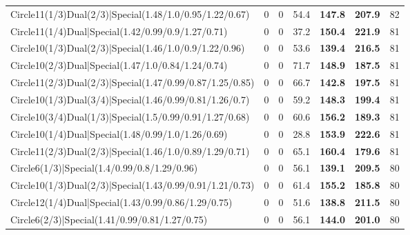 \begin{tabular}{lrrrllr}
 Circle11(1/3)Dual(2/3)|Special(1.48/1.0/0.95/1.22/0.67)        &          0   &            0   &          54.4 & \textbf{147.8} & \textbf{207.9} &           82 \\
 Circle11(1/4)Dual|Special(1.42/0.99/0.9/1.27/0.71)             &          0   &            0   &          37.2 & \textbf{150.4} & \textbf{221.9} &           81 \\
 Circle10(1/3)Dual(2/3)|Special(1.46/1.0/0.9/1.22/0.96)         &          0   &            0   &          53.6 & \textbf{139.4} & \textbf{216.5} &           81 \\
 Circle10(2/3)Dual|Special(1.47/1.0/0.84/1.24/0.74)             &          0   &            0   &          71.7 & \textbf{148.9} & \textbf{187.5} &           81 \\
 Circle11(2/3)Dual(2/3)|Special(1.47/0.99/0.87/1.25/0.85)       &          0   &            0   &          66.7 & \textbf{142.8} & \textbf{197.5} &           81 \\
 Circle10(1/3)Dual(3/4)|Special(1.46/0.99/0.81/1.26/0.7)        &          0   &            0   &          59.2 & \textbf{148.3} & \textbf{199.4} &           81 \\
 Circle10(3/4)Dual(1/3)|Special(1.5/0.99/0.91/1.27/0.68)        &          0   &            0   &          60.6 & \textbf{156.2} & \textbf{189.3} &           81 \\
 Circle10(1/4)Dual|Special(1.48/0.99/1.0/1.26/0.69)             &          0   &            0   &          28.8 & \textbf{153.9} & \textbf{222.6} &           81 \\
 Circle11(2/3)Dual(2/3)|Special(1.46/1.0/0.89/1.29/0.71)        &          0   &            0   &          65.1 & \textbf{160.4} & \textbf{179.6} &           81 \\
 Circle6(1/3)|Special(1.4/0.99/0.8/1.29/0.96)                   &          0   &            0   &          56.1 & \textbf{139.1} & \textbf{209.5} &           80 \\
 Circle10(1/3)Dual(2/3)|Special(1.43/0.99/0.91/1.21/0.73)       &          0   &            0   &          61.4 & \textbf{155.2} & \textbf{185.8} &           80 \\
 Circle12(1/4)Dual|Special(1.43/0.99/0.86/1.29/0.75)            &          0   &            0   &          51.6 & \textbf{138.8} & \textbf{211.5} &           80 \\
 Circle6(2/3)|Special(1.41/0.99/0.81/1.27/0.75)                 &          0   &            0   &          56.1 & \textbf{144.0} & \textbf{201.0} &           80 \\

\end{tabular}
